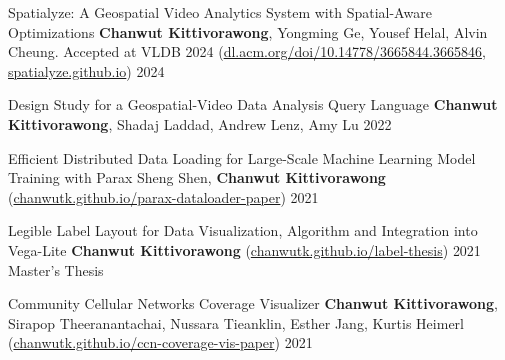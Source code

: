 

\begin{cvpubs}

  \cvpub
    {Spatialyze: A Geospatial Video Analytics System with Spatial-Aware Optimizations} %
    {\textbf{Chanwut Kittivorawong}, Yongming Ge, Yousef Helal, Alvin Cheung. Accepted at VLDB 2024 (\href{https://dl.acm.org/doi/10.14778/3665844.3665846}{dl.acm.org/doi/10.14778/3665844.3665846}, \href{https://spatialyze.github.io}{spatialyze.github.io})} %
    {2024} %
    {} %
    
  \cvpub
    {Design Study for a Geospatial-Video Data Analysis Query Language} %
    {\textbf{Chanwut Kittivorawong}, Shadaj Laddad, Andrew Lenz, Amy Lu} %
    {2022} %
    {} %

  \cvpub
    {Efficient Distributed Data Loading for Large-Scale Machine Learning Model Training with Parax} %
    {Sheng Shen, \textbf{Chanwut Kittivorawong} (\href{https://chanwutk.github.io/parax-dataloader-paper}{chanwutk.github.io/parax-dataloader-paper})} %
    {2021} %
    {} %

  \cvpub
    {Legible Label Layout for Data Visualization, Algorithm and Integration into Vega-Lite} %
    {\textbf{Chanwut Kittivorawong} (\href{https://chanwutk.github.io/label-thesis}{chanwutk.github.io/label-thesis})} %
    {2021} %
    {Master's Thesis} %

  \cvpub
    {Community Cellular Networks Coverage Visualizer} %
    {\textbf{Chanwut Kittivorawong}, Sirapop Theeranantachai, Nussara Tieanklin, Esther Jang, Kurtis Heimerl (\href{https://chanwutk.github.io/ccn-coverage-vis-paper}{chanwutk.github.io/ccn-coverage-vis-paper})} %
    {2021} %
    {} %



\end{cvpubs}

